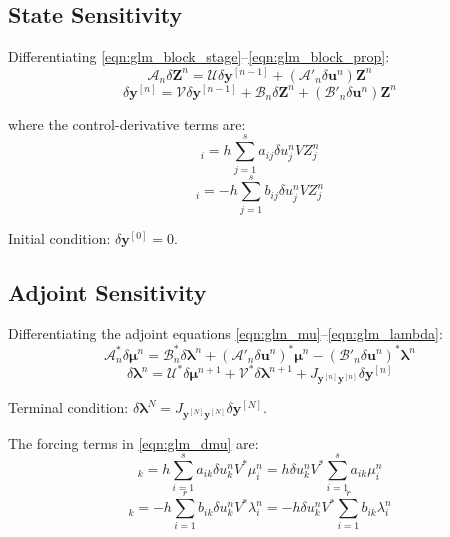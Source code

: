 \documentclass[11pt]{article}
\newcommand{\herm}{^\ast}
\newcommand{\Zv}{\mathbf{Z}}
\newcommand{\yv}{\mathbf{y}}
\newcommand{\uv}{\mathbf{u}}
\newcommand{\lv}{\boldsymbol{\lambda}}
\newcommand{\mv}{\boldsymbol{\mu}}
\newcommand{\Av}{\mathcal{A}}
\newcommand{\Bv}{\mathcal{B}}
\newcommand{\Uv}{\mathcal{U}}
\newcommand{\Vv}{\mathcal{V}}
\begin{document}
\subsection{State Sensitivity}

Differentiating \eqref{eqn:glm_block_stage}--\eqref{eqn:glm_block_prop}:
\begin{equation}
\label{eqn:glm_dZ}
\boxed{\Av_n \delta\Zv^n = \Uv \delta\yv^{[n-1]} + (\Av'_n \delta\uv^n) \Zv^n}
\end{equation}
\begin{equation}
\label{eqn:glm_dy}
\boxed{\delta\yv^{[n]} = \Vv \delta\yv^{[n-1]} + \Bv_n \delta\Zv^n + (\Bv'_n \delta\uv^n) \Zv^n}
\end{equation}

where the control-derivative terms are:
\begin{equation}
[(\Av'_n \delta\uv^n) \Zv^n]_i = h \sum_{j=1}^s a_{ij} \delta u_j^n V Z_j^n
\end{equation}
\begin{equation}
[(\Bv'_n \delta\uv^n) \Zv^n]_i = -h \sum_{j=1}^s b_{ij} \delta u_j^n V Z_j^n
\end{equation}

Initial condition: $\delta\yv^{[0]} = 0$.

\subsection{Adjoint Sensitivity}

Differentiating the adjoint equations \eqref{eqn:glm_mu}--\eqref{eqn:glm_lambda}:
\begin{equation}
\label{eqn:glm_dmu}
\boxed{\Av_n\herm \delta\mv^n = \Bv_n\herm \delta\lv^n + (\Av'_n \delta\uv^n)\herm \mv^n - (\Bv'_n \delta\uv^n)\herm \lv^n}
\end{equation}
\begin{equation}
\label{eqn:glm_dlambda}
\boxed{\delta\lv^n = \Uv\herm \delta\mv^{n+1} + \Vv\herm \delta\lv^{n+1} + J_{\yv^{[n]}\yv^{[n]}} \delta\yv^{[n]}}
\end{equation}

Terminal condition: $\delta\lv^N = J_{\yv^{[N]}\yv^{[N]}} \delta\yv^{[N]}$.

The forcing terms in \eqref{eqn:glm_dmu} are:
\begin{equation}
[(\Av'_n \delta\uv^n)\herm \mv^n]_k = h \sum_{i=1}^s a_{ik} \delta u_k^n V\herm \mu_i^n = h \delta u_k^n V\herm \sum_{i=1}^s a_{ik} \mu_i^n
\end{equation}
\begin{equation}
[(\Bv'_n \delta\uv^n)\herm \lv^n]_k = -h \sum_{i=1}^r b_{ik} \delta u_k^n V\herm \lambda_i^n = -h \delta u_k^n V\herm \sum_{i=1}^r b_{ik} \lambda_i^n
\end{equation}
\end{document}
